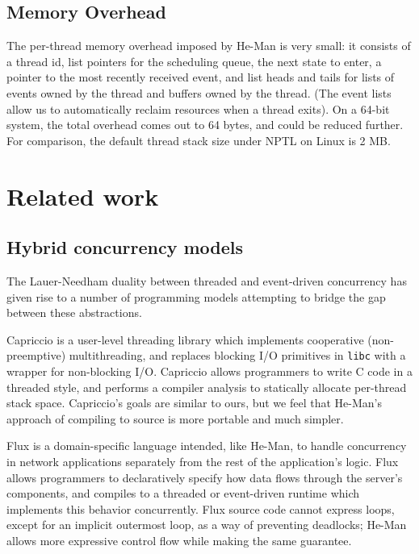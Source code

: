\documentclass[preprint]{sigplanconf}
\renewcommand{\t}{\texttt}
\begin{document}
\subsection{Memory Overhead}

The per-thread memory overhead imposed by He-Man is very small: it consists of a
thread id, list pointers for the scheduling queue, the next state to enter, a
pointer to the most recently received event, and list heads and tails for lists
of events owned by the thread and buffers owned by the thread.  (The event lists
allow us to automatically reclaim resources when a thread exits). On a 64-bit
system, the total overhead comes out to 64 bytes, and could be reduced further.
For comparison, the default thread stack size under NPTL on Linux is 2 MB.

\section{Related work}

\subsection{Hybrid concurrency models}

The Lauer-Needham duality \cite{LauerNeedham} between threaded and event-driven
concurrency has given rise to a number of programming models attempting to
bridge the gap between these abstractions. 

Capriccio \cite{vonBehrenEtAl} is a user-level threading library which
implements cooperative (non-preemptive) multithreading, and replaces blocking
I/O primitives in \t{libc} with a wrapper for non-blocking I/O. Capriccio allows
programmers to write C code in a threaded style, and performs a compiler
analysis to statically allocate per-thread stack space. Capriccio's goals are
similar to ours, but we feel that He-Man's approach of compiling to source is
more portable and much simpler.

Flux \cite{BurnsEtAl} is a domain-specific language intended, like He-Man, to
handle concurrency in network applications separately from the rest of the
application's logic. Flux allows programmers to declaratively specify how data
flows through the server's components, and compiles to a threaded or
event-driven runtime which implements this behavior concurrently. Flux source
code cannot express loops, except for an implicit outermost loop, as a way of
preventing deadlocks; He-Man allows more expressive control flow while making
the same guarantee.
\end{document}
